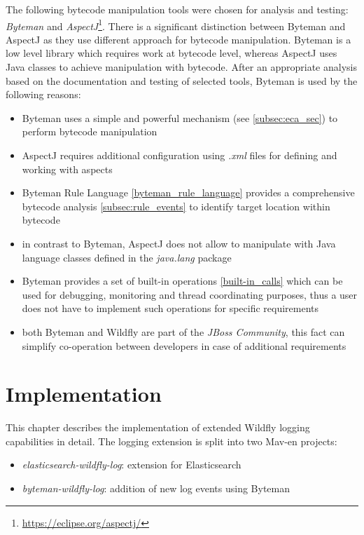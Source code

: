 \documentclass[12pt,oneside]{fithesis2}
\begin{document}
The following bytecode manipulation tools were chosen for analysis and testing: \textit{Byteman} and \textit{AspectJ}\footnote{\url{https://eclipse.org/aspectj/}}. There is a significant distinction between Byteman and AspectJ as they use different approach for bytecode manipulation. Byteman is a low level library which requires work at bytecode level, whereas AspectJ uses Java classes to achieve manipulation with bytecode. After an appropriate analysis based on the documentation and testing of selected tools, Byteman is used by the following reasons:

\begin{itemize}
	\item Byteman uses a simple and powerful mechanism (see \ref{subsec:eca_sec}) to perform bytecode manipulation 
	\item AspectJ requires additional configuration using \textit{.xml} files for defining and working with aspects \cite[Configuration]{aspectj_doc}
	\item Byteman Rule Language \ref{byteman_rule_language} provides a comprehensive bytecode analysis \ref{subsec:rule_events} to identify target location within bytecode
	\item in contrast to Byteman, AspectJ does not allow to manipulate with Java language classes defined in the \textit{java.lang} package \cite[Special cases]{aspectj_doc}
	\item Byteman provides a set of built-in operations \ref{built-in_calls} which can be used for debugging, monitoring and thread coordinating purposes, thus a user does not have to implement such operations for specific requirements
	\item both Byteman and Wildfly are part of the \textit{JBoss Community}, this fact can simplify co-operation between developers in case of additional requirements
\end{itemize}

\chapter{Implementation}
\label{implementation}
This chapter describes the implementation of extended Wildfly logging capabilities in detail. The logging extension is split into two Mav-en projects:

\begin{itemize}
	\item \textit{elasticsearch-wildfly-log}: extension for Elasticsearch
	\item \textit{byteman-wildfly-log}: addition of new log events using Byteman
\end{itemize}
\end{document}
